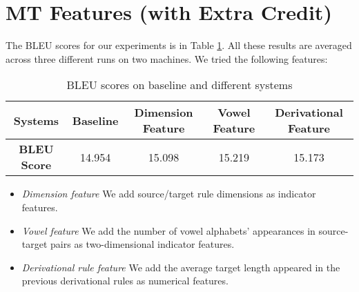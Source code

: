 \documentclass[letterpaper]{article}
\begin{document}
\section{MT Features (with Extra Credit)}
The BLEU scores for our experiments is in Table \ref{tab:bleu}. All these results are averaged across three different runs on two machines. We tried the following features:
\begin{table}
\begin{center}
\begin{tabular}{c|c|c|c|c}
\hline
\textbf{Systems} & Baseline & Dimension Feature & Vowel Feature & Derivational Feature \\
\hline
\textbf{BLEU Score} & 14.954 & 15.098 & 15.219 & 15.173 \\
\hline
\end{tabular}
\caption{BLEU scores on baseline and different systems}\label{tab:bleu}
\end{center}
\end{table}
\begin{itemize}
\item \textit{Dimension feature} We add source/target rule dimensions as indicator features.
\item \textit{Vowel feature} We add the number of vowel alphabets' appearances in source-target pairs as two-dimensional indicator features.
\item \textit{Derivational rule feature} We add the average target length appeared in the previous derivational rules as numerical features.
\end{itemize}




\end{document}
